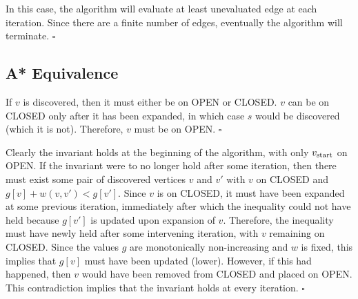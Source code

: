 \documentclass[nobib]{tufte-book}
\newcommand{\ms}[1]{\mbox{\scriptsize #1}}
\newenvironment{proof}[1][Proof]{\begin{trivlist}
   \item[\hskip \labelsep {\bfseries #1}]}{\hfill$\square$\end{trivlist}}
\begin{document}
\begin{proof}[Proof of Theorem \ref{thm:lazy-completeness}]
In this case,
the algorithm will evaluate at least unevaluated edge at
each iteration.
Since there are a finite number of edges,
eventually the algorithm will terminate.
\end{proof}

\subsection{A* Equivalence}

\begin{proof}[Proof of Invariant \ref{inv:astar-cundisc-popen}]
If $v$ is discovered, then it must either be on OPEN or CLOSED.
$v$ can be on CLOSED only after it has been expanded,
in which case $s$ would be discovered (which it is not).
Therefore, $v$ must be on OPEN.
\end{proof}

\begin{proof}[Proof of Invariant \ref{inv:astar-wless-popen}]
Clearly the invariant holds at the beginning of the algorithm,
with only $v_{\ms{start}}$ on OPEN.
If the invariant were to no longer hold after some iteration,
then there must exist some pair of discovered vertices $v$ and $v'$
with $v$ on CLOSED and $g[v] + w(v,v') < g[v']$.
Since $v$ is on CLOSED,
it must have been expanded at some previous iteration,
immediately after which the inequality could not have held
because $g[v']$ is updated upon expansion of $v$.
Therefore,
the inequality must have newly held after some intervening iteration,
with $v$ remaining on CLOSED.
Since the values $g$ are monotonically non-increasing and $w$ is fixed,
this implies that $g[v]$ must have been updated (lower).
However,
if this had happened,
then $v$ would have been removed from CLOSED and placed on OPEN.
This contradiction implies that the invariant holds at every iteration.
\end{proof}
\end{document}
